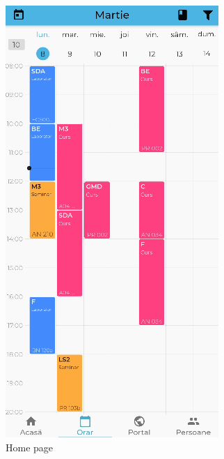 \begin{figure}[!ht]
\begin{minipage}[b]{0.26\textwidth}
        \caption{Home page}
        \label{3:fig:homepage}
    \end{minipage}
    \hfill
    \begin{minipage}[b]{0.26\textwidth}
        \captionsetup{justification=centering}
        \includegraphics[width=\textwidth]{figures/beforedev/image2.png}

\end{minipage}
\end{figure}
